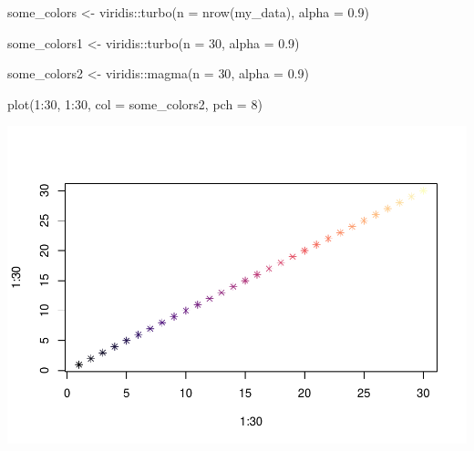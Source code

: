 \documentclass[
  11pt,
]{article}
\newenvironment{Shaded}{\begin{snugshade}}{\end{snugshade}}
\newcommand{\AttributeTok}[1]{\textcolor[rgb]{0.77,0.63,0.00}{#1}}
\newcommand{\DecValTok}[1]{\textcolor[rgb]{0.00,0.00,0.81}{#1}}
\newcommand{\FloatTok}[1]{\textcolor[rgb]{0.00,0.00,0.81}{#1}}
\newcommand{\FunctionTok}[1]{\textcolor[rgb]{0.00,0.00,0.00}{#1}}
\newcommand{\NormalTok}[1]{#1}
\newcommand{\OtherTok}[1]{\textcolor[rgb]{0.56,0.35,0.01}{#1}}
\newcommand{\SpecialCharTok}[1]{\textcolor[rgb]{0.00,0.00,0.00}{#1}}
\begin{document}
\begin{Shaded}
\begin{Highlighting}[]
\NormalTok{some\_colors }\OtherTok{\textless{}{-}}\NormalTok{ viridis}\SpecialCharTok{::}\FunctionTok{turbo}\NormalTok{(}\AttributeTok{n =} \FunctionTok{nrow}\NormalTok{(my\_data), }\AttributeTok{alpha =} \FloatTok{0.9}\NormalTok{)}

\NormalTok{some\_colors1 }\OtherTok{\textless{}{-}}\NormalTok{ viridis}\SpecialCharTok{::}\FunctionTok{turbo}\NormalTok{(}\AttributeTok{n =} \DecValTok{30}\NormalTok{, }\AttributeTok{alpha =} \FloatTok{0.9}\NormalTok{)}

\NormalTok{some\_colors2 }\OtherTok{\textless{}{-}}\NormalTok{ viridis}\SpecialCharTok{::}\FunctionTok{magma}\NormalTok{(}\AttributeTok{n =} \DecValTok{30}\NormalTok{, }\AttributeTok{alpha =} \FloatTok{0.9}\NormalTok{)}

\FunctionTok{plot}\NormalTok{(}\DecValTok{1}\SpecialCharTok{:}\DecValTok{30}\NormalTok{, }\DecValTok{1}\SpecialCharTok{:}\DecValTok{30}\NormalTok{, }\AttributeTok{col =}\NormalTok{ some\_colors2, }\AttributeTok{pch =} \DecValTok{8}\NormalTok{)}
\end{Highlighting}
\end{Shaded}

\includegraphics{Supp_Info_1_files/figure-latex/unnamed-chunk-4-1.pdf}
\end{document}
